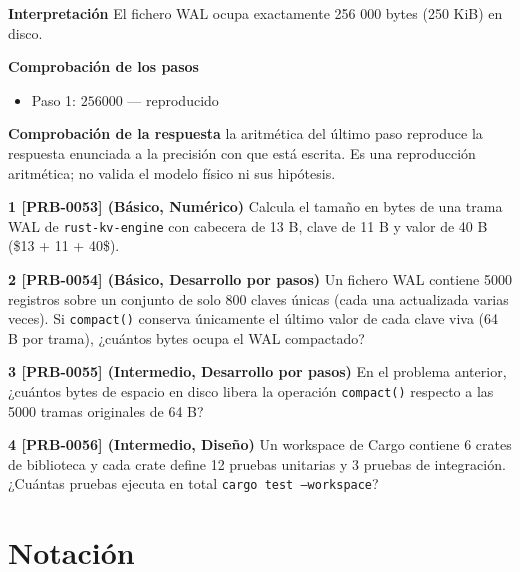 \documentclass{book}
\begin{document}
\begin{tcolorbox}[title={Problema resuelto}, studiumworked, breakable]
\noindent\textbf{Interpretación}
El fichero WAL ocupa exactamente 256 000 bytes (250 KiB) en disco.

\noindent\textbf{Comprobación de los pasos}
\begin{itemize}
\item Paso 1: $256000$ — reproducido
\end{itemize}

\noindent\textbf{Comprobación de la respuesta} la aritmética del último paso reproduce la respuesta enunciada a la precisión con que está escrita. Es una reproducción aritmética; no valida el modelo físico ni sus hipótesis.
\end{tcolorbox}

\begin{tcolorbox}[title={Ejercicios}, studiumworked, breakable]

\noindent\textbf{1 [PRB-0053] (Básico, Numérico)}
Calcula el tamaño en bytes de una trama WAL de \texttt{rust-kv-engine} con cabecera de 13 B, clave de 11 B y valor de 40 B (\$13 + 11 + 40\$).

\noindent\textbf{2 [PRB-0054] (Básico, Desarrollo por pasos)}
Un fichero WAL contiene 5000 registros sobre un conjunto de solo 800 claves únicas (cada una actualizada varias veces). Si \texttt{compact()} conserva únicamente el último valor de cada clave viva (64 B por trama), ¿cuántos bytes ocupa el WAL compactado?

\noindent\textbf{3 [PRB-0055] (Intermedio, Desarrollo por pasos)}
En el problema anterior, ¿cuántos bytes de espacio en disco libera la operación \texttt{compact()} respecto a las 5000 tramas originales de 64 B?

\noindent\textbf{4 [PRB-0056] (Intermedio, Diseño)}
Un workspace de Cargo contiene 6 crates de biblioteca y cada crate define 12 pruebas unitarias y 3 pruebas de integración. ¿Cuántas pruebas ejecuta en total \texttt{cargo test --workspace}?
\end{tcolorbox}
\appendix
\chapter{Notación}
\end{document}
